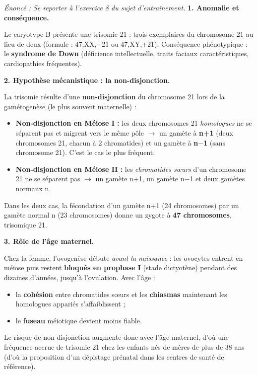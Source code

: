 \documentclass[11pt]{article}
\newcommand{\cle}[1]{{\popxbold\color{popdark}#1}}
\begin{document}
\begin{corrige}
\textit{Énoncé : Se reporter à l'exercice 8 du sujet d'entraînement.}
\tcblower
\textbf{1. Anomalie et conséquence.}

Le caryotype B présente une \cle{trisomie 21} : trois exemplaires du chromosome 21 au lieu de deux (formule : 47,XX,+21 ou 47,XY,+21). Conséquence phénotypique : le \textbf{syndrome de Down} (déficience intellectuelle, traits faciaux caractéristiques, cardiopathies fréquentes).

\textbf{2. Hypothèse mécanistique : la non-disjonction.}

La trisomie résulte d'une \textbf{non-disjonction} du chromosome 21 lors de la gamétogenèse (le plus souvent maternelle) :
\begin{itemize}
    \item \textbf{Non-disjonction en Méiose I :} les deux chromosomes 21 \emph{homologues} ne se séparent pas et migrent vers le même pôle $\to$ un gamète à \textbf{n+1} (deux chromosomes 21, chacun à 2 chromatides) et un gamète à \textbf{n$-$1} (sans chromosome 21). C'est le cas le plus fréquent.
    \item \textbf{Non-disjonction en Méiose II :} les \emph{chromatides sœurs} d'un chromosome 21 ne se séparent pas $\to$ un gamète n+1, un gamète n$-$1 et deux gamètes normaux n.
\end{itemize}
Dans les deux cas, la fécondation d'un gamète n+1 (24 chromosomes) par un gamète normal n (23 chromosomes) donne un zygote à \textbf{47 chromosomes}, trisomique 21.

\textbf{3. Rôle de l'âge maternel.}

Chez la femme, l'ovogenèse débute \emph{avant la naissance} : les ovocytes entrent en méiose puis restent \textbf{bloqués en prophase I} (stade dictyotène) pendant des dizaines d'années, jusqu'à l'ovulation. Avec l'âge :
\begin{itemize}
    \item la \textbf{cohésion} entre chromatides sœurs et les \textbf{chiasmas} maintenant les homologues appariés s'affaiblissent ;
    \item le \textbf{fuseau} méiotique devient moins fiable.
\end{itemize}
Le risque de non-disjonction augmente donc avec l'âge maternel, d'où une fréquence accrue de trisomie 21 chez les enfants nés de mères de plus de 38 ans (d'où la proposition d'un dépistage prénatal dans les centres de santé de référence).
\end{corrige}
\end{document}
